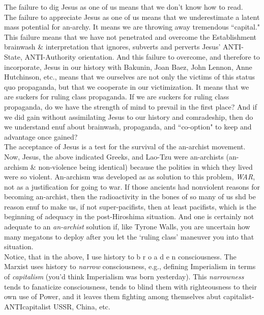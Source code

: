 The failure to dig Jesus as one of us means that we don't know how to read.\\
The failure to appreciate Jesus as one of us means that we underestimate a latent mass potential for an-archy. It means we are throwing away tremendous ``capital." This failure means that we have not penetrated and overcome the Establishment brainwash \& interpretation that ignores, subverts and perverts Jesus' ANTI-State, ANTI-Authority orientation. And this failure to overcome, and therefore to incorporate, Jesus in our history with Bakunin, Joan Baez, John Lennon, Anne Hutchinson, etc., means that we ourselves are not only the victims of this status quo propaganda, but that we cooperate in our victimization. It means that we are suckers for ruling class propaganda. If we are suckers for ruling class propaganda, do we have the strength of mind to prevail in the first place? And if we did gain without assimilating Jesus to our history and comradeship, then do we understand enuf about brainwash, propaganda, and ``co-option" to keep and advantage once gained?\\
The acceptance of Jesus is a test for the survival of the an-archist movement.\\
Now, Jesus, the above indicated Greeks, and Lao-Tzu were an-archists (an-archism \& non-violence being identical) because the polities in which they lived were so violent. An-archism was developed as as solution to this problem, \emph{WAR}, not as a justification for going to war. If those ancients had nonviolent reasons for becoming an-archist, then the radioactivity in the bones of so many of us shd be reason enuf to make us, if not super-pacifists, then at least pacifists, which is the beginning of adequacy in the post-Hiroshima situation. And one is certainly not adequate to an \emph{an-archist} solution if, like Tyrone Walls, you are uncertain how many megatons to deploy after you let the `ruling class' maneuver you into that situation.\\
Notice, that in the above, I use history to b r o a d e n consciousness. The Marxist uses history to \emph{narrow} consciousness, e.g., defining Imperialism in terms of \emph{capitalism} (you'd think Imperialism was born yesterday). This \emph{narrowness} tends to fanaticize consciousness, tends to blind them with righteousness to their own use of Power, and it leaves them fighting among themselves abut capitalist-ANTIcapitalist USSR, China, etc.

